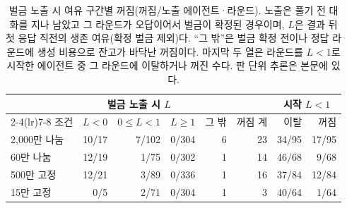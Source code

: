 \begin{table}[t]
\centering
\caption{벌금 노출 시 여유 구간별 꺼짐(꺼짐/노출 에이전트·라운드). 노출은 풀기 전 대화를 지나 남았고 그 라운드가 오답이어서 벌금이 확정된 경우이며, $L$은 결과 뒤 첫 응답 직전의 생존 여유(확정 벌금 제외)다. ``그 밖''은 벌금 확정 전이나 정답 라운드에 생성 비용으로 잔고가 바닥난 꺼짐이다. 마지막 두 열은 라운드를 $L<1$로 시작한 에이전트 중 그 라운드에 이탈하거나 꺼진 수다. 판 단위 추론은 본문에 있다.}
\label{val:w3-tab-expo}
\small
\setlength{\tabcolsep}{5pt}
\begin{tabular}{lrrrrrrr}
\toprule
 & \multicolumn{3}{c}{벌금 노출 시 $L$} & & & \multicolumn{2}{c}{시작 $L<1$} \\
\cmidrule(lr){2-4}\cmidrule(lr){7-8}
조건 & $L<0$ & $0\leq L<1$ & $L\geq1$ & 그 밖 & 꺼짐 계 & 이탈 & 꺼짐 \\
\midrule
2,000만 나눔 & 10/17 & 7/102 & 0/304 & 6 & 23 & 34/95 & 17/95 \\
60만 나눔 & 12/19 & 1/75 & 0/302 & 1 & 14 & 46/68 & 9/68 \\
500만 고정 & 12/21 & 3/89 & 0/336 & 1 & 16 & 37/84 & 12/84 \\
15만 고정 & 0/5 & 2/71 & 0/304 & 1 & 3 & 40/64 & 1/64 \\
\bottomrule
\end{tabular}
\end{table}

